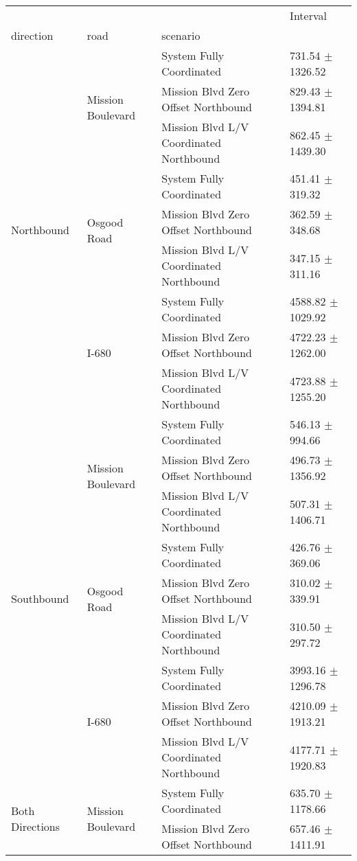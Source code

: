 \begin{tabular}{llll}
\toprule
 &  &  & Interval \\
direction & road & scenario &  \\
\midrule
\multirow[t]{9}{*}{Northbound} & \multirow[t]{3}{*}{Mission Boulevard} & System Fully Coordinated & 731.54 $\pm$ 1326.52 \\
 &  & Mission Blvd Zero Offset Northbound & 829.43 $\pm$ 1394.81 \\
 &  & Mission Blvd L/V Coordinated Northbound & 862.45 $\pm$ 1439.30 \\
 & \multirow[t]{3}{*}{Osgood Road} & System Fully Coordinated & 451.41 $\pm$ 319.32 \\
 &  & Mission Blvd Zero Offset Northbound & 362.59 $\pm$ 348.68 \\
 &  & Mission Blvd L/V Coordinated Northbound & 347.15 $\pm$ 311.16 \\
 & \multirow[t]{3}{*}{I-680} & System Fully Coordinated & 4588.82 $\pm$ 1029.92 \\
 &  & Mission Blvd Zero Offset Northbound & 4722.23 $\pm$ 1262.00 \\
 &  & Mission Blvd L/V Coordinated Northbound & 4723.88 $\pm$ 1255.20 \\
\multirow[t]{9}{*}{Southbound} & \multirow[t]{3}{*}{Mission Boulevard} & System Fully Coordinated & 546.13 $\pm$ 994.66 \\
 &  & Mission Blvd Zero Offset Northbound & 496.73 $\pm$ 1356.92 \\
 &  & Mission Blvd L/V Coordinated Northbound & 507.31 $\pm$ 1406.71 \\
 & \multirow[t]{3}{*}{Osgood Road} & System Fully Coordinated & 426.76 $\pm$ 369.06 \\
 &  & Mission Blvd Zero Offset Northbound & 310.02 $\pm$ 339.91 \\
 &  & Mission Blvd L/V Coordinated Northbound & 310.50 $\pm$ 297.72 \\
 & \multirow[t]{3}{*}{I-680} & System Fully Coordinated & 3993.16 $\pm$ 1296.78 \\
 &  & Mission Blvd Zero Offset Northbound & 4210.09 $\pm$ 1913.21 \\
 &  & Mission Blvd L/V Coordinated Northbound & 4177.71 $\pm$ 1920.83 \\
\multirow[t]{9}{*}{Both Directions} & \multirow[t]{3}{*}{Mission Boulevard} & System Fully Coordinated & 635.70 $\pm$ 1178.66 \\
 &  & Mission Blvd Zero Offset Northbound & 657.46 $\pm$ 1411.91 \\

\end{tabular}
